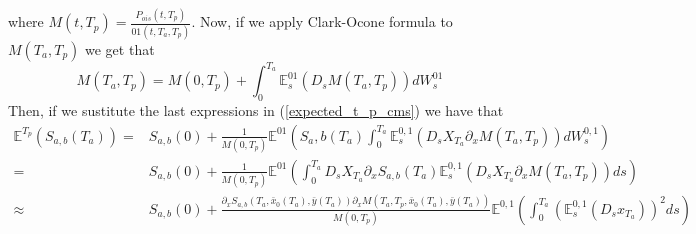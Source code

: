 \documentclass[a4paper,10pt]{article}
\newcommand{\1}{\mathbf{1}}
\begin{document}
where $M(t,T_p)= \frac{P_{ois}(t,T_p)}{01(t,T_a,T_p)}$. Now, if we apply Clark-Ocone formula to $M(T_a,T_p)$ we get that
\begin{equation} \label{clark_ocone_swap_m}
M(T_a,T_p) = M(0,T_p)+ \int_{0}^{T_a} \mathbb{E}_s^{01}\left(D_s M(T_a,T_p)\right) dW^{01}_s
\end{equation}
Then, if we sustitute the last expressions in (\ref{expected_t_p_cms}) we have that
\begin{align}\label{cms_first_order_convexity}
\mathbb{E}^{T_p}\left(S_{a,b}(T_a)\right) =& S_{a,b}(0) + \frac{1}{M(0,T_p)} \mathbb{E}^{01}\left( S_a,b(T_a) \int_{0}^{T_a} \mathbb{E}^{0,1}_s\left(D_sX_{T_a}\partial_x M(T_a,T_p)  \right) dW^{0,1}_s   \right) \nonumber \\
=&  S_{a,b}(0) + \frac{1}{M(0,T_p)} \mathbb{E}^{01}\left(\int_{0}^{T_a} D_s X_{T_a} \partial_x S_{a,b}(T_a) \mathbb{E}^{0,1}_s\left(D_sX_{T_a}\partial_x M(T_a,T_p)  \right) ds   \right) \nonumber \\
\approx&  S_{a,b}(0) + \frac{\partial_x S_{a,b}(T_a, \bar{x}_0(T_a),\bar{y}(T_a))\partial_x M(T_a,T_p, \bar{x}_0(T_a),\bar{y}(T_a))}{M(0,T_p)} \mathbb{E}^{0,1}\left( \int_{0}^{T_a} \left(\mathbb{E}_s^{0,1}\left( D_s x_{T_a}\right)\right)^{2} ds  \right)
\end{align}
\end{document}
